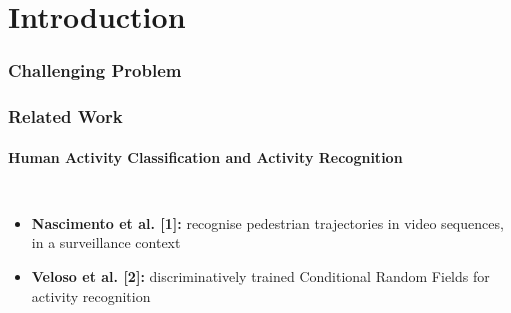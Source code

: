 \section{Introduction}

\begin{frame}
	\frametitle{Challenging Problem}
	
	\begin{center}
	\end{center}
\end{frame}

\begin{frame}
	\frametitle{Related Work}
	\framesubtitle{Human Activity Classification and Activity Recognition}
	
	\vspace{0.4cm}
	
	\begin{columns}[T]
		
		\vspace{0.2cm}
		
		\begin{itemize}
			\item \textbf{Nascimento et al. [1]:} recognise pedestrian trajectories in
				  video sequences, in a surveillance context
			
			\vspace{1.2cm}
			
			\item \textbf{Veloso et al. [2]:} discriminatively trained Conditional Random
				  Fields for activity recognition
		\end{itemize}
		
		

\end{columns}
\end{frame}
